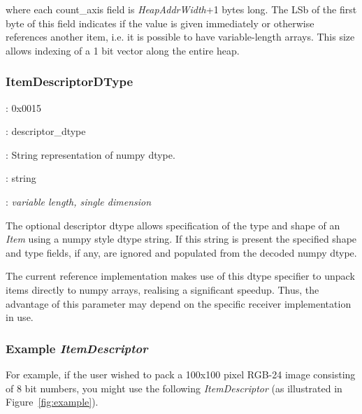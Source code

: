 \documentclass[11pt,english,twoside]{article}
\begin{document}
where each count\_axis field is \emph{HeapAddrWidth}+1 bytes long. The LSb of the first byte of this field indicates if the value is given
immediately or otherwise references another item, i.e. it is possible to have variable-length arrays. This size allows indexing of a 1 bit vector
along the entire heap.

\subsubsection{ItemDescriptorDType}

\begin{description}
\setlength{\itemindent}{0.5cm}
\setlength{\itemsep}{0ex plus0.2ex}
\item[Numerical Identifier]: 0x0015
\item[Name]: descriptor\_dtype
\item[Description]: String representation of numpy dtype.
\item[Type]: string
\item[Shape]: \emph{variable length, single dimension}
\end{description}

The optional descriptor dtype allows specification of the type and shape of an \emph{Item} using a numpy style dtype string. If this string is
present the specified shape and type fields, if any, are ignored and populated from the decoded numpy dtype.

The current reference implementation makes use of this dtype specifier to unpack items directly to numpy arrays, realising a significant
speedup. Thus, the advantage of this parameter may depend on the specific receiver implementation in use.


\subsubsection{\label{sec:ex_descript}Example \emph{ItemDescriptor}}

For example, if the user wished to pack a 100x100 pixel RGB-24 image consisting of 8 bit numbers, you might use the following
\emph{ItemDescriptor} (as illustrated in Figure~\ref{fig:example}).
\end{document}
